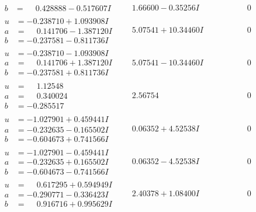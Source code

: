 \documentclass[1p]{elsarticle_modified}
\theoremstyle{definition}
\begin{document}
$$\begin{array}{c|c|c}
\begin{aligned}
b &= \phantom{-}0.428888 - 0.517607 I\end{aligned}
 & \phantom{-}1.66600 - 0.35256 I & \phantom{-0.000000 } 0 \\ \hline\begin{aligned}
u &= -0.238710 + 1.093908 I \\
a &= \phantom{-}0.141706 - 1.387120 I \\
b &= -0.237581 - 0.811736 I\end{aligned}
 & \phantom{-}5.07541 + 10.34460 I & \phantom{-0.000000 } 0 \\ \hline\begin{aligned}
u &= -0.238710 - 1.093908 I \\
a &= \phantom{-}0.141706 + 1.387120 I \\
b &= -0.237581 + 0.811736 I\end{aligned}
 & \phantom{-}5.07541 - 10.34460 I & \phantom{-0.000000 } 0 \\ \hline\begin{aligned}
u &= \phantom{-}1.12548\phantom{ +0.000000I} \\
a &= \phantom{-}0.340024\phantom{ +0.000000I} \\
b &= -0.285517\phantom{ +0.000000I}\end{aligned}
 & \phantom{-}2.56754\phantom{ +0.000000I} & \phantom{-0.000000 } 0 \\ \hline\begin{aligned}
u &= -1.027901 + 0.459441 I \\
a &= -0.232635 - 0.165502 I \\
b &= -0.604673 + 0.741566 I\end{aligned}
 & \phantom{-}0.06352 + 4.52538 I & \phantom{-0.000000 } 0 \\ \hline\begin{aligned}
u &= -1.027901 - 0.459441 I \\
a &= -0.232635 + 0.165502 I \\
b &= -0.604673 - 0.741566 I\end{aligned}
 & \phantom{-}0.06352 - 4.52538 I & \phantom{-0.000000 } 0 \\ \hline\begin{aligned}
u &= \phantom{-}0.617295 + 0.594949 I \\
a &= -0.290771 - 0.336423 I \\
b &= \phantom{-}0.916716 + 0.995629 I\end{aligned}
 & \phantom{-}2.40378 + 1.08400 I & \phantom{-0.000000 } 0\\

\end{array}$$
\end{document}
